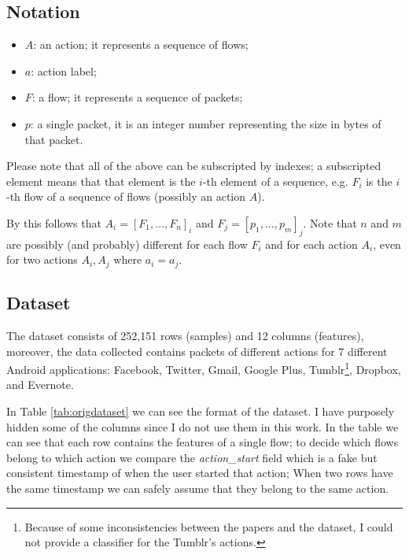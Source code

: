 \subsection{Notation}
\label{subsec:notation}
\begin{itemize}
 \item $ A $: an action; it represents a sequence of flows;
 \item $ a $: action label;
 \item $ F $: a flow; it represents a sequence of packets;
 \item $ p $: a single packet, it is an integer number representing the size in bytes of that packet.
\end{itemize}

Please note that all of the above can be subscripted by indexes; a subscripted element means that that element is the $i$-th element of a sequence, e.g. $F_i$ is the $i$-th flow of a sequence of flows (possibly an action $A$).
 
By this follows that $A_i = [F_1, \dots, F_n]_i$ and $F_j = [p_1,\dots, p_m]_j$. Note that $n$ and $m$ are possibly (and probably) different for each flow $F_i$ and for each action $A_i$, even for two actions $A_i, A_j$ where $a_i = a_j$.

\subsection{Dataset}
The dataset consists of 252,151 rows (samples) and 12 columns (features), moreover, the data collected contains packets of different actions for 7 different Android applications: Facebook, Twitter, Gmail, Google Plus, Tumblr\footnote{Because of some inconsistencies between the papers and the dataset, I could not provide a classifier for the Tumblr's actions.}, Dropbox, and Evernote. 

In Table \ref{tab:origdataset} we can see the format of the dataset. I have purposely hidden some of the columns since I do not use them in this work. In the table we can see that each row contains the features of a single flow; to decide which flows belong to which action we compare the \textit{action\_start} field which is a fake but consistent timestamp of when the user started that action; When two rows have the same timestamp we can safely assume that they belong to the same action.


